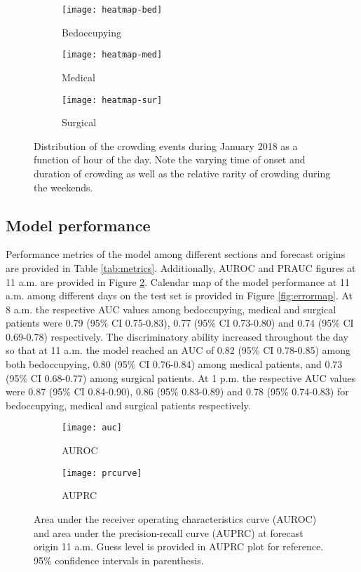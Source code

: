 \begin{figure}[H]
    \centering
        \begin{subfigure}[b]{0.30\textwidth}
            \texttt{[image: heatmap-bed]}
            \caption{Bedoccupying}
        \end{subfigure}
        \begin{subfigure}[b]{0.30\textwidth}
            \texttt{[image: heatmap-med]}
            \caption{Medical}
        \end{subfigure}
        \begin{subfigure}[b]{0.30\textwidth}
            \texttt{[image: heatmap-sur]}
            \caption{Surgical}
        \end{subfigure}
        \caption{Distribution of the crowding events during January 2018 as a function of hour of the day. Note the varying time of onset and duration of crowding as well as the relative rarity of crowding during the weekends.}
        \label{fig:heatmap}
\end{figure}



\subsection{Model performance}

Performance metrics of the model among different sections and forecast origins are provided in Table \ref{tab:metrics}. Additionally, AUROC and PRAUC figures at 11 a.m. are provided in Figure \ref{fig:auroc_and_auprc}. Calendar map of the model performance at 11 a.m. among different days on the test set is provided in Figure \ref{fig:errormap}. At 8 a.m. the respective AUC values among bedoccupying, medical and surgical patients were 0.79 (95\% CI 0.75-0.83), 0.77 (95\% CI 0.73-0.80) and 0.74 (95\% CI 0.69-0.78) respectively. The discriminatory ability increased throughout the day so that at 11 a.m. the model reached an AUC of 0.82 (95\% CI 0.78-0.85) among both bedoccupying, 0.80 (95\% CI 0.76-0.84) among medical patients, and 0.73 (95\% CI 0.68-0.77) among surgical patients. At 1 p.m. the respective AUC values were 0.87 (95\% CI 0.84-0.90), 0.86 (95\% 0.83-0.89) and 0.78 (95\% 0.74-0.83) for bedoccupying, medical and surgical patients respectively.

\begin{figure}[H]
    \centering
    \begin{subfigure}[b]{0.35\textwidth}
        \texttt{[image: auc]}
        \caption{AUROC}
    \end{subfigure}
    \begin{subfigure}[b]{0.57\textwidth}
        \texttt{[image: prcurve]}
        \caption{AUPRC}
    \end{subfigure}
    \caption{Area under the receiver operating characteristics curve (AUROC) and area under the precision-recall curve (AUPRC) at forecast origin 11 a.m. Guess level is provided in AUPRC plot for reference. 95\% confidence intervals in parenthesis.}
    \label{fig:auroc_and_auprc}
\end{figure}


